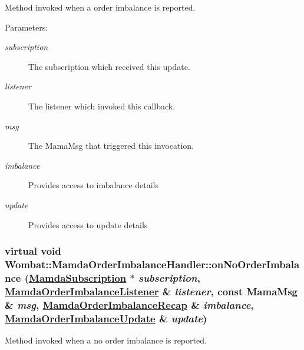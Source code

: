 Method invoked when a order imbalance is reported. 

\begin{Desc}
\item[Parameters:]
\begin{description}
\item[{\em subscription}]The subscription which received this update. \item[{\em listener}]The listener which invoked this callback. \item[{\em msg}]The Mama\-Msg that triggered this invocation. \item[{\em imbalance}]Provides access to imbalance details \item[{\em update}]Provides access to update details \end{description}
\end{Desc}
\hypertarget{classWombat_1_1MamdaOrderImbalanceHandler_f1b804e726d1cb782ebb0e4cbf8461b2}{
\subsubsection[onNoOrderImbalance]{\setlength{\rightskip}{0pt plus 5cm}virtual void Wombat::Mamda\-Order\-Imbalance\-Handler::on\-No\-Order\-Imbalance (\hyperlink{classWombat_1_1MamdaSubscription}{Mamda\-Subscription} $\ast$ {\em subscription}, \hyperlink{classWombat_1_1MamdaOrderImbalanceListener}{Mamda\-Order\-Imbalance\-Listener} \& {\em listener}, const Mama\-Msg \& {\em msg}, \hyperlink{classWombat_1_1MamdaOrderImbalanceRecap}{Mamda\-Order\-Imbalance\-Recap} \& {\em imbalance}, \hyperlink{classWombat_1_1MamdaOrderImbalanceUpdate}{Mamda\-Order\-Imbalance\-Update} \& {\em update})}}
\label{classWombat_1_1MamdaOrderImbalanceHandler_f1b804e726d1cb782ebb0e4cbf8461b2}


Method invoked when a no order imbalance is reported. 

